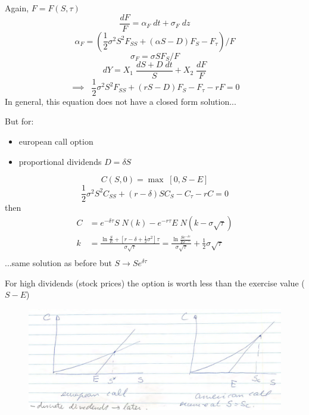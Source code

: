 \documentclass[
14pt,notheorems,hyperref={pdfauthor=whatever}
]{beamer}
\begin{document}
\begin{frame}
Again, $F = F(S,\tau)$\\
\[\frac{dF}{F} = \alpha_F\;dt+\sigma_F\;dz\]
\[\alpha_F = (\frac{1}{2} \sigma^2 S^2 F_{SS} + (\alpha S-D) F_S - F_\tau) / F\]
\[\sigma_F = \sigma S F_S / F\]
\[dY = X_1\;\frac{dS+D\;dt}{S}+X_2\;\frac{dF}{F}\]
\[\implies\;\; \frac{1}{2} \sigma^2 S^2 F_{SS} + (rS-D)F_S - F_\tau -rF = 0\]
In general, this equation does not have a closed form solution...
\end{frame}

\begin{frame}
But for:
\begin{itemize}
    \item european call option\\
    \item proportional dividends $D=\delta S$\\
\end{itemize}
\[C(S,0) = \max\;[0,S-E]\]
\[\frac{1}{2} \sigma^2 S^2 C_{SS} + (r-\delta)S C_S - C_\tau -rC = 0\]
then
\begin{align*}
    C &= e^{-\delta \tau} S\;N(k) - e^{-r \tau} E\;N(k-\sigma\sqrt{\tau})\\
    k &= \frac{\ln{\frac{S}{E}}+[r-\delta+\frac{1}{2}\sigma^2]\tau}{\sigma\sqrt{\tau}} = \frac{\ln{\frac{S e^{-\delta\tau}}{E e^{-r\tau}}}}{\sigma\sqrt{\tau}}+\frac{1}{2}\sigma\sqrt{\tau}\\
\end{align*}
...same solution as before but $S \longrightarrow S e^{\delta\tau}$
\end{frame}

\begin{frame}
For high dividends (stock prices) the option is worth less than the exercise value ($S-E$)
\begin{figure}[div-model]
    \includegraphics[width=1\textwidth]{images/L14-divmodel.png}
    \centering
\end{figure}
\end{frame}
\end{document}
